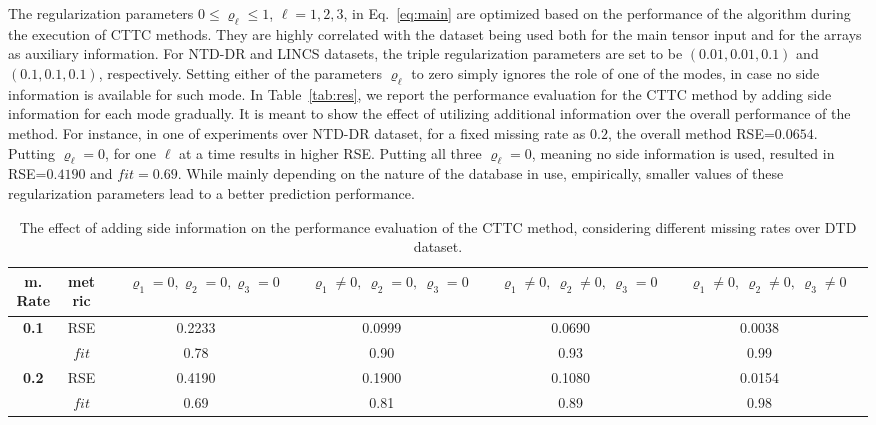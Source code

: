 \documentclass{article}
\begin{document}
The regularization parameters $0\le \varrho_\ell\le 1$, $\ell=1,2,3$, in Eq.~\eqref{eq:main} are optimized based on the performance of the
algorithm during the execution of CTTC methods. They are highly correlated with the dataset being used both for the main tensor input and for the arrays as auxiliary information. For NTD-DR and LINCS datasets, the triple regularization parameters are set to be $(0.01, 0.01, 0.1)$ and $(0.1,0.1,0.1)$, respectively. Setting either of the parameters $\varrho_\ell$ to zero
simply ignores the role of one of the modes, in case no side information is available for such mode. In Table~\ref{tab:res}, we report the performance evaluation for the CTTC method by adding side information for each mode gradually. It is meant to show the effect of utilizing additional information over the overall performance of the method. For instance, in one of experiments over NTD-DR dataset, for a fixed missing rate as $0.2$, the overall method RSE=$0.0654$. Putting $\varrho_\ell=0$, for one $\ell$ at a time results in higher RSE. Putting all three $\varrho_\ell=0$, meaning no side information is used, resulted in RSE=$0.4190$ and $fit=0.69$. While mainly depending on the nature of the database in use, empirically, smaller values of these regularization parameters lead to a better prediction performance. 

\begin{table}
\renewcommand{\arraystretch}{1.4}
\renewcommand{\arraystretch}{1.4}
\centering
\resizebox{0.8\textwidth}{!}
{
\begin{tabular}{||c|| c ||c ||c ||c ||c ||c }
\hline
\textbf{m. Rate}& \textbf{metric}&{~~${\varrho_1=0,\varrho_2=0,\varrho_3=0}$~~} &{~~\textbf{$\varrho_1\neq0,~\varrho_2=0,~\varrho_3=0$}~~} & {~~\textbf{$\varrho_1\neq0,~\varrho_2\neq0,~
\varrho_3=0$}~~}  &
{~~\textbf{$\varrho_1\neq0,~\varrho_2\neq0,~\varrho_3\neq0$}~~}
\\
\hline
\hline
\multirow{2}{*}{\textbf{0.1}}
&\cellcolor{black!05!white}
RSE
& \cellcolor{black!05!white}
0.2233
& \cellcolor{black!05!white}
0.0999
&\cellcolor{black!05!white}
0.0690

& \cellcolor{black!05!white}
0.0038
\\
&
$fit$
&0.78
& 0.90
& 0.93
& 0.99
\\
\hline
\hline
\multirow{2}{*}{\textbf{0.2}}
&\cellcolor{black!05!white}
RSE
& \cellcolor{black!05!white} 
0.4190
&\cellcolor{black!05!white}
0.1900
&\cellcolor{black!05!white}
0.1080
& \cellcolor{black!05!white}
0.0154
\\
&$fit$
& 0.69
&0.81
&0.89
& 0.98
\\
\hline
\hline
\end{tabular}}
\vspace{0.09in}
\caption{%
The effect of adding side information on the performance evaluation of the CTTC method, considering different missing rates over DTD dataset.  }
\label{tab:ell}
\end{table} 
\end{document}
